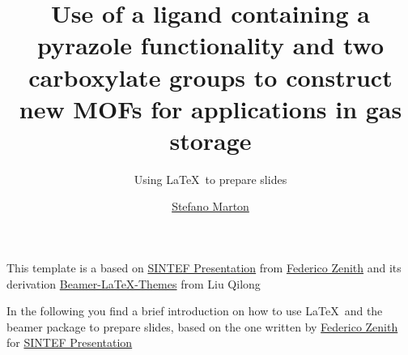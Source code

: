 \documentclass{beamer}
\title{Use of a ligand containing a pyrazole functionality and two carboxylate groups to construct new MOFs for applications in gas storage}
\subtitle{Using \LaTeX\ to prepare slides}
\author{\href{mailto:ciao@gio.im}{Stefano Marton}}
\newcommand{\hrefcol}[2]{\textcolor{cyan}{\href{#1}{#2}}}
\begin{document}
\maketitle

\begin{frame}

	This template is a based on \hrefcol{https://www.overleaf.com/latex/templates/sintef-presentation/jhbhdffczpnx}{SINTEF Presentation} from \hrefcol{mailto:federico.zenith@sintef.no}{Federico Zenith} and its derivation \hrefcol{https://github.com/TOB-KNPOB/Beamer-LaTeX-Themes}{Beamer-LaTeX-Themes} from Liu Qilong

	\vspace{\baselineskip}

	In the following you find a brief introduction on how to use \LaTeX\ and the beamer package to prepare slides, based on the one written by \hrefcol{mailto:federico.zenith@sintef.no}{Federico Zenith} for \hrefcol{https://www.overleaf.com/latex/templates/sintef-presentation/jhbhdffczpnx}{SINTEF Presentation}


\end{frame}

\backmatter
\end{document}
